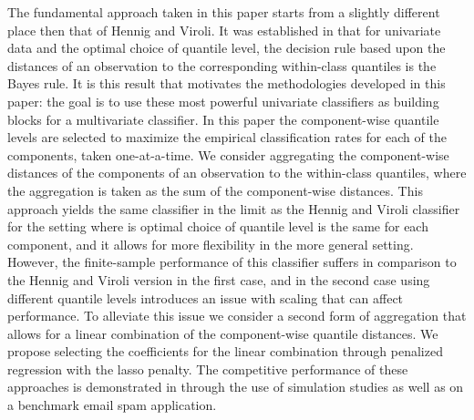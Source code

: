 The fundamental approach taken in this paper starts from a slightly different
place then that of Hennig and Viroli.  It was established in \citep{hennig2016}
that for univariate data and the optimal choice of quantile level, the decision
rule based upon the distances of an observation to the corresponding
within-class quantiles is the Bayes rule.  It is this result that motivates the
methodologies developed in this paper: the goal is to use these most powerful
univariate classifiers as building blocks for a multivariate classifier.  In
this paper the component-wise quantile levels are selected to maximize the
empirical classification rates for each of the components, taken one-at-a-time.
We consider aggregating the component-wise distances of the components of an
observation to the within-class quantiles, where the aggregation is taken as the
sum of the component-wise distances.  This approach yields the same classifier
in the limit as the Hennig and Viroli classifier for the setting where is
optimal choice of quantile level is the same for each component, and it allows
for more flexibility in the more general setting.  However, the finite-sample
performance of this classifier suffers in comparison to the Hennig and Viroli
version in the first case, and in the second case using different quantile
levels introduces an issue with scaling that can affect performance.  To
alleviate this issue we consider a second form of aggregation that allows for a
linear combination of the component-wise quantile distances.  We propose
selecting the coefficients for the linear combination through penalized
regression with the lasso penalty.  The competitive performance of these
approaches is demonstrated in through the use of simulation studies as well as
on a benchmark email spam application.





